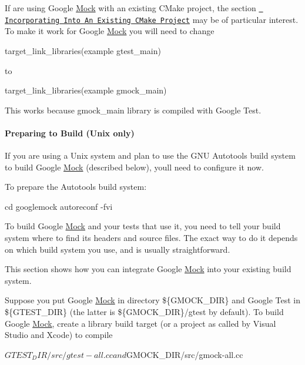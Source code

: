 If are using Google \mbox{\hyperlink{classMock}{Mock}} with an existing C\+Make project, the section \href{../googletest/README.md\#incorporating-into-an-existing-cmake-project}{\texttt{ Incorporating Into An Existing C\+Make Project}} may be of particular interest. To make it work for Google \mbox{\hyperlink{classMock}{Mock}} you will need to change \begin{DoxyVerb}target_link_libraries(example gtest_main)
\end{DoxyVerb}


to \begin{DoxyVerb}target_link_libraries(example gmock_main)
\end{DoxyVerb}


This works because {\ttfamily gmock\+\_\+main} library is compiled with Google Test.

\paragraph*{Preparing to Build (Unix only)}

If you are using a Unix system and plan to use the G\+NU Autotools build system to build Google \mbox{\hyperlink{classMock}{Mock}} (described below), you\textquotesingle{}ll need to configure it now.

To prepare the Autotools build system\+: \begin{DoxyVerb}cd googlemock
autoreconf -fvi
\end{DoxyVerb}


To build Google \mbox{\hyperlink{classMock}{Mock}} and your tests that use it, you need to tell your build system where to find its headers and source files. The exact way to do it depends on which build system you use, and is usually straightforward.

This section shows how you can integrate Google \mbox{\hyperlink{classMock}{Mock}} into your existing build system.

Suppose you put Google \mbox{\hyperlink{classMock}{Mock}} in directory {\ttfamily \$\{G\+M\+O\+C\+K\+\_\+\+D\+IR\}} and Google Test in {\ttfamily \$\{G\+T\+E\+S\+T\+\_\+\+D\+IR\}} (the latter is {\ttfamily \$\{G\+M\+O\+C\+K\+\_\+\+D\+IR\}/gtest} by default). To build Google \mbox{\hyperlink{classMock}{Mock}}, create a library build target (or a project as called by Visual Studio and Xcode) to compile \begin{DoxyVerb}${GTEST_DIR}/src/gtest-all.cc and ${GMOCK_DIR}/src/gmock-all.cc
\end{DoxyVerb}



